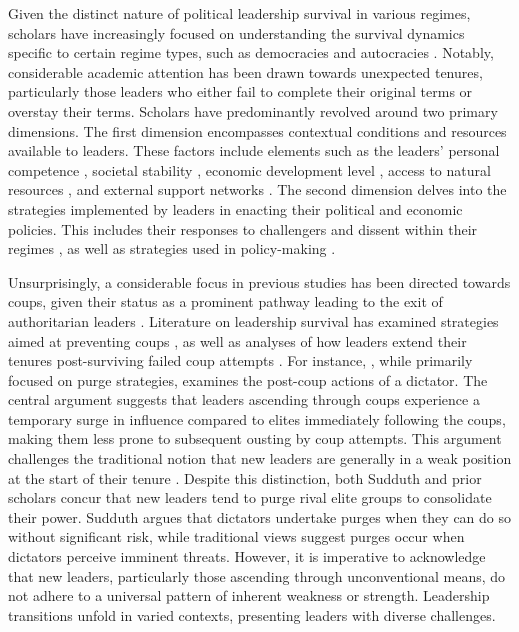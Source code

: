 \documentclass[
  12pt,
  a4paper,
  12pt]{article}
\begin{document}
Given the distinct nature of political leadership survival in various
regimes, scholars have increasingly focused on understanding the
survival dynamics specific to certain regime types, such as democracies
\citep{svolik2014} and autocracies \citep{davenport2021}. Notably,
considerable academic attention has been drawn towards unexpected
tenures, particularly those leaders who either fail to complete their
original terms or overstay their terms. Scholars have predominantly
revolved around two primary dimensions. The first dimension encompasses
contextual conditions and resources available to leaders. These factors
include elements such as the leaders' personal competence
\citep{yu2016}, societal stability \citep{arriola2009}, economic
development level \citep{palmer1999, williams2011}, access to natural
resources \citep{smith2004, quirozflores2012}, and external support
networks \citep{licht2009, wright2008, thyne2017}. The second dimension
delves into the strategies implemented by leaders in enacting their
political and economic policies. This includes their responses to
challengers and dissent within their regimes
\citep{escribà-folch2013, davenport2021}, as well as strategies used in
policy-making \citep{gandhi2007, morrison2009}.

Unsurprisingly, a considerable focus in previous studies has been
directed towards coups, given their status as a prominent pathway
leading to the exit of authoritarian leaders
\citep{svolik2008, frantz2016}. Literature on leadership survival has
examined strategies aimed at preventing coups
\citep{powell2017, sudduth2017, debruin2020}, as well as analyses of how
leaders extend their tenures post-surviving failed coup attempts
\citep{easton2018}. For instance, \citet{sudduth2017a}, while primarily
focused on purge strategies, examines the post-coup actions of a
dictator. The central argument suggests that leaders ascending through
coups experience a temporary surge in influence compared to elites
immediately following the coups, making them less prone to subsequent
ousting by coup attempts. This argument challenges the traditional
notion that new leaders are generally in a weak position at the start of
their tenure \citep{roessler2011}. Despite this distinction, both
Sudduth and prior scholars concur that new leaders tend to purge rival
elite groups to consolidate their power. Sudduth argues that dictators
undertake purges when they can do so without significant risk, while
traditional views suggest purges occur when dictators perceive imminent
threats. However, it is imperative to acknowledge that new leaders,
particularly those ascending through unconventional means, do not adhere
to a universal pattern of inherent weakness or strength. Leadership
transitions unfold in varied contexts, presenting leaders with diverse
challenges.
\end{document}
